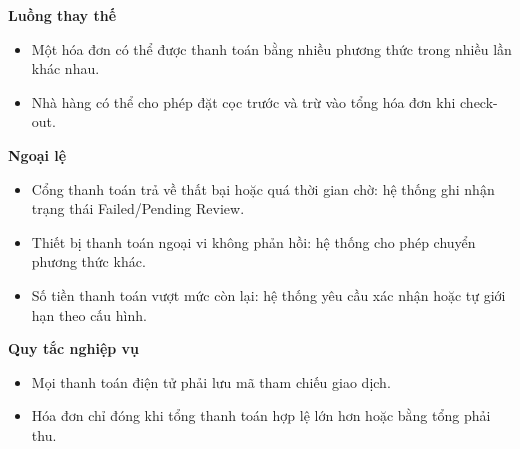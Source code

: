 \documentclass[11pt,a4paper]{article}
\begin{document}
\begin{usecasebox}[title={UC-PAY-01 --- Xử lý thanh toán}]
    \textbf{Luồng thay thế}
    \begin{itemize}[leftmargin=1.8em]
  \item Một hóa đơn có thể được thanh toán bằng nhiều phương thức trong nhiều lần khác nhau.
  \item Nhà hàng có thể cho phép đặt cọc trước và trừ vào tổng hóa đơn khi check-out.
\end{itemize}

    \textbf{Ngoại lệ}
    \begin{itemize}[leftmargin=1.8em]
  \item Cổng thanh toán trả về thất bại hoặc quá thời gian chờ: hệ thống ghi nhận trạng thái \textsf{Failed/Pending Review}.
  \item Thiết bị thanh toán ngoại vi không phản hồi: hệ thống cho phép chuyển phương thức khác.
  \item Số tiền thanh toán vượt mức còn lại: hệ thống yêu cầu xác nhận hoặc tự giới hạn theo cấu hình.
\end{itemize}

    \textbf{Quy tắc nghiệp vụ}
    \begin{itemize}[leftmargin=1.8em]
  \item Mọi thanh toán điện tử phải lưu mã tham chiếu giao dịch.
  \item Hóa đơn chỉ đóng khi tổng thanh toán hợp lệ lớn hơn hoặc bằng tổng phải thu.
\end{itemize}
    \end{usecasebox}
\end{document}

